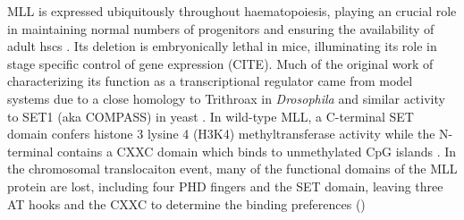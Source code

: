 



%


MLL is expressed ubiquitously throughout haematopoiesis, playing an crucial role in maintaining normal numbers of progenitors and ensuring the availability of adult \glspl{hsc} \cite{Meyer2017, Antunes2020, Ernst2004} . Its deletion is embryonically lethal in mice, illuminating its role in stage specific control of gene expression (CITE). Much of the original work of characterizing its function as a transcriptional regulator came from model systems due to a close homology to Trithroax in \textit{Drosophila} and similar activity to SET1 (aka COMPASS) in yeast \cite{Popovic2005}. 
In wild-type MLL, a C-terminal SET domain confers histone 3 lysine 4 (H3K4) methyltransferase activity while the N-terminal contains a CXXC domain which binds to unmethylated CpG islands \cite{JJ2003, Hsieh2003, Cierpicki2010,Ayton2004,LE2013}. 
In the chromosomal translocaiton event, many of the functional domains of the MLL protein are lost, including four PHD fingers and the SET domain, leaving three AT hooks and the CXXC to determine the binding preferences ()


